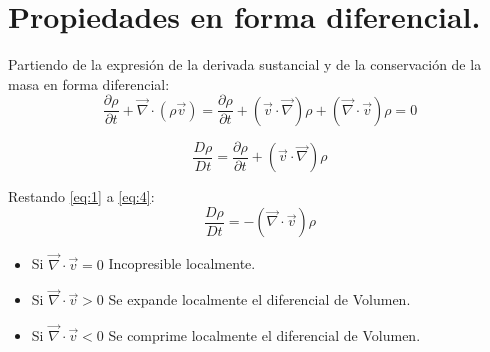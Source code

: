 \section{Propiedades en forma diferencial.}
Partiendo de la expresión de la derivada sustancial y de la conservación de la masa en forma diferencial:
\begin{equation} \label{eq:1}
	\frac{\partial \rho}{\partial t} +\vec{\nabla}\cdot\left(\rho\vec{v}\right)=\frac{\partial \rho}{\partial t} +\left(\vec{v}\cdot\vec{\nabla}\right)\rho+\left(\vec{\nabla}\cdot\vec{v}\right)\rho=0
\end{equation}

\begin{equation} \label{eq:4}
	\frac{D \rho}{D t}=\frac{ \partial \rho}{\partial t}+\left(\vec{v}\cdot\vec{\nabla}\right)\rho
\end{equation}

Restando \eqref{eq:1} a \eqref{eq:4}:
\[\frac{D \rho}{D t}=-\left(\vec{\nabla}\cdot\vec{v}\right)\rho\]
\begin{itemize}
	\item Si $\vec{\nabla}\cdot\vec{v} =0 $ Incopresible localmente.
	\item Si $\vec{\nabla}\cdot\vec{v} >0$ Se expande localmente el diferencial de Volumen.
	\item Si $\vec{\nabla}\cdot\vec{v} <0$ Se comprime localmente el diferencial de Volumen.
\end{itemize}
